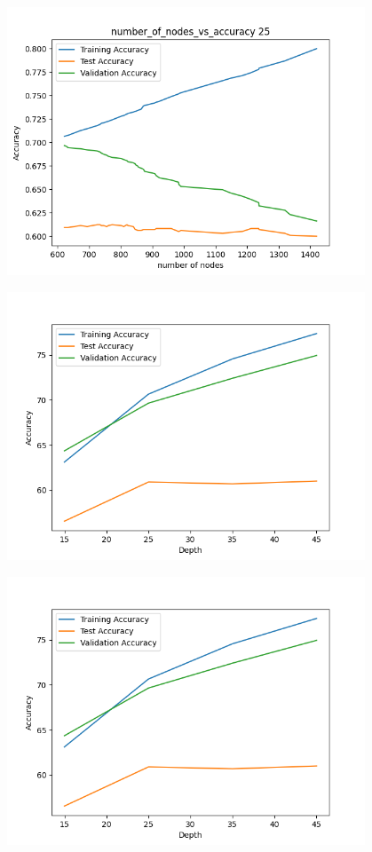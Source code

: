 \documentclass[12pt]{article}
\begin{document}
\begin{center}
    \includegraphics[width=0.8\textwidth]{Assignment 3/q1/(c)number_of_nodes_vs_accuracy 25.png}
\end{center}

\begin{center}
    \includegraphics[width=0.8\textwidth]{Assignment 3/q1/(c)depth_vs_accuracy after pruning.png}
\end{center}

\begin{center}
    \includegraphics[width=0.8\textwidth]{Assignment 3/q1/(c)depth_vs_accuracy after pruning.png}
\end{center}
\end{document}
